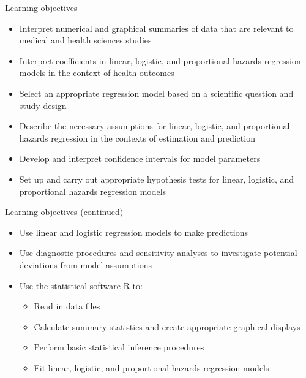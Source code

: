 \documentclass{beamer}
\begin{document}
\begin{frame}{Learning objectives}
\begin{itemize}
	\item Interpret numerical and graphical summaries of data that are relevant to medical and health sciences studies
	\item Interpret coefficients in linear, logistic, and proportional hazards regression models in the context of health outcomes
	\item 
Select an appropriate regression model based on a scientific question and study design
	\item Describe the necessary assumptions for linear, logistic, and proportional hazards regression in the contexts of estimation and prediction
	\item Develop and interpret confidence intervals for model parameters
	\item Set up and carry out appropriate hypothesis tests for linear, logistic, and proportional hazards regression models
	
\end{itemize}
\end{frame}

\begin{frame}{Learning objectives (continued)}
\begin{itemize}
	\item Use linear and logistic regression models to make predictions
	\item Use diagnostic procedures and sensitivity analyses to investigate potential deviations from model assumptions
	\item Use the statistical software R to:
	\begin{itemize}
		\item Read in data files
		\item Calculate summary statistics and create appropriate graphical displays
		\item Perform basic statistical inference procedures
		\item Fit linear, logistic, and proportional hazards regression models
	\end{itemize}
\end{itemize}
\end{frame}
\end{document}
